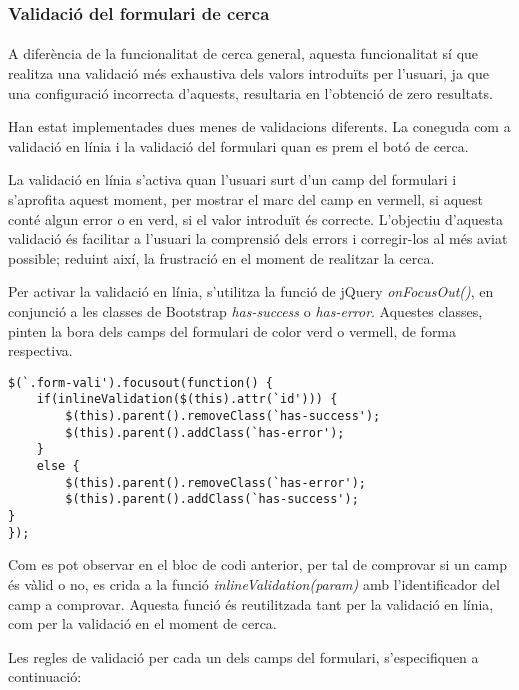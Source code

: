 \subsubsection{Validació del formulari de cerca}

\paragraph{}
A diferència de la funcionalitat de cerca general, aquesta funcionalitat sí que realitza una validació més exhaustiva dels valors introduïts per l'usuari, ja que una configuració incorrecta d'aquests, resultaria en l’obtenció de zero resultats.

Han estat implementades dues menes de validacions diferents. La coneguda com a validació en línia i la validació del formulari quan es prem el botó de cerca.

La validació en línia s'activa quan l'usuari surt d'un camp del formulari i s'aprofita aquest moment, per mostrar el marc del camp en vermell, si aquest conté algun error o en verd, si el valor introduït és correcte. L'objectiu d'aquesta validació és facilitar a l'usuari la comprensió dels errors i corregir-los al més aviat possible; reduint així, la frustració en el moment de realitzar la cerca.

Per activar la validació en línia, s'utilitza la funció de jQuery \emph{onFocusOut()}, en conjunció a les classes de Bootstrap \emph{has-success} o \emph{has-error}. Aquestes classes, pinten la bora dels camps del formulari de color verd o vermell, de forma respectiva.

\begin{lstlisting}[style=rawOwn,caption={Activació de la validació en línia}]
$(`.form-vali').focusout(function() {
    if(inlineValidation($(this).attr(`id'))) {
        $(this).parent().removeClass(`has-success');
        $(this).parent().addClass(`has-error');
    }
    else {
        $(this).parent().removeClass(`has-error');
        $(this).parent().addClass(`has-success');
}
});
\end{lstlisting}

Com es pot observar en el bloc de codi anterior, per tal de comprovar si un camp és vàlid o no, es crida a la funció \emph{inlineValidation(param)} amb l’identificador del camp a comprovar. Aquesta funció és reutilitzada tant per la validació en línia, com per la validació en el moment de cerca.

Les regles de validació per cada un dels camps del formulari, s'especifiquen a continuació:

